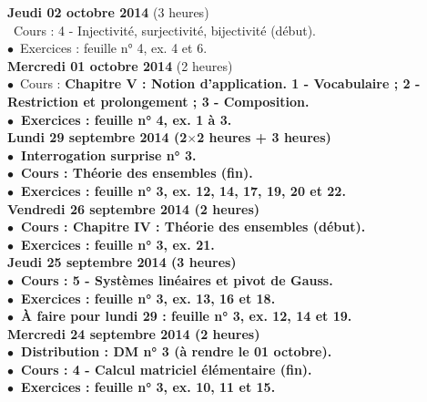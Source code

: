 \documentclass[12pt,a4paper]{article}
\begin{document}
\noindent\textbf{ \bf Jeudi 02 octobre 2014 \rm}(3 heures)\\
\bu\ Cours : 4 - Injectivité, surjectivité, bijectivité (début).\\
$\bullet$\ Exercices : feuille n° 4, ex. 4 et 6.\vspace{.4cm}\\

\noindent\textbf{\bf Mercredi 01 octobre 2014 \rm} (2 heures)\\
$\bullet$\ Cours : \bf Chapitre V \rm : Notion d'application. 1 - Vocabulaire ;
2 - Restriction et prolongement ; 3 - Composition.\\
$\bullet$\ Exercices : feuille n° 4, ex. 1 à 3.\vspace{.4cm}\\

\noindent\textbf{ \bf Lundi 29 septembre 2014 \rm}(2$\times$2 heures + 3
heures)\\
$\bullet$\ Interrogation surprise n° 3.\\
$\bullet$\ Cours : Théorie des ensembles (fin).\\
$\bullet$\ Exercices : feuille n° 3, ex. 12, 14, 17, 19, 20 et
22.\vspace{.4cm}\\

\noindent\textbf{ \bf Vendredi 26 septembre 2014 \rm}(2 heures)\\
$\bullet$\ Cours : \bf Chapitre IV  \rm: Théorie des ensembles (début).\\
$\bullet$\ Exercices : feuille n° 3, ex. 21.\vspace{.4cm}\\

\noindent\textbf{ \bf Jeudi 25 septembre 2014 \rm}(3 heures)\\
$\bullet$\ Cours : 5 - Systèmes linéaires et pivot de Gauss.\\
$\bullet$\ Exercices : feuille n° 3, ex. 13, 16 et 18.\\
$\bullet$\ À faire pour lundi 29 : feuille n° 3, ex. 12, 14 et
19.\vspace{.4cm}\\

\noindent\textbf{\bf Mercredi 24 septembre 2014 \rm} (2 heures)\\
$\bullet$\ Distribution : DM n° 3 (à rendre le 01 octobre).\\
$\bullet$\ Cours : 4 - Calcul matriciel élémentaire (fin).\\
$\bullet$\ Exercices : feuille n° 3, ex. 10, 11 et 15.\vspace{.4cm}\\
 
\end{document}
